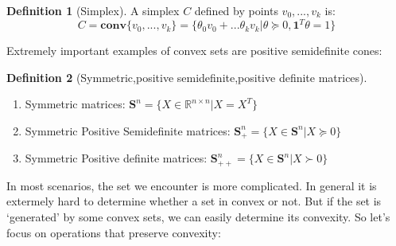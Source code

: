 \documentclass[
]{book}
\providecommand{\tightlist}{%
  \setlength{\itemsep}{0pt}\setlength{\parskip}{0pt}}
\theoremstyle{definition}
\newtheorem{definition}{Definition}[chapter]
\theoremstyle{definition}
\theoremstyle{definition}
\theoremstyle{definition}
\theoremstyle{remark}
\begin{document}
\begin{definition}[Simplex]
\protect\hypertarget{def:simplex}{}\label{def:simplex}A simplex \(C\) defined by points \(v_0,...,v_k\) is: \[C = \textbf{conv}\{v_0,...,v_k\} = \{\theta_0v_0 + ... \theta_kv_k|\theta \succeq 0, \textbf{1}^T\theta = 1\}\]
\end{definition}

Extremely important examples of convex sets are positive semidefinite cones:

\begin{definition}[Symmetric,positive semidefinite,positive definite matrices]
\protect\hypertarget{def:symmetricmatrices}{}\label{def:symmetricmatrices}\leavevmode

\begin{enumerate}
\def\labelenumi{\arabic{enumi}.}
\tightlist
\item
  Symmetric matrices: \(\textbf{S}^n = \{X\in\mathbb{R}^{n\times n}| X=X^T\}\)
\item
  Symmetric Positive Semidefinite matrices: \(\textbf{S}_+^n = \{X\in\textbf{S}^n| X\succeq0\}\)
\item
  Symmetric Positive definite matrices: \(\textbf{S}_{++}^n = \{X\in\textbf{S}^n| X\succ0\}\)
\end{enumerate}

\end{definition}

In most scenarios, the set we encounter is more complicated. In general it is extermely hard to determine whether a set in convex or not. But if the set is `generated' by some convex sets, we can easily determine its convexity. So let's focus on operations that preserve convexity:
\end{document}
